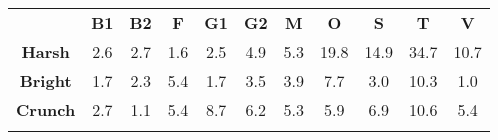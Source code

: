 \begin{tabular}{|c||c|c|c|c|c|c|c|c|c|c|}
	\cline{2-11}
	\multicolumn{1}{c|}{} & \bf{B1} & \bf{B2} & \bf{F} & \bf{G1} & \bf{G2} & \bf{M} & \bf{O} & \bf{S} & \bf{T} & \bf{V} \tabularnewline
	\hhline{-::=:=:=:=:=:=:=:=:=:=:}
	\bf{Harsh} &  2.6 &  2.7 &  1.6 &  2.5 &  4.9 &  5.3 & 19.8 & 14.9 & 34.7 & 10.7 \tabularnewline
	\hhline{-||-|-|-|-|-|-|-|-|-|-|}
	\bf{Bright} &  1.7 &  2.3 &  5.4 &  1.7 &  3.5 &  3.9 &  7.7 &  3.0 & 10.3 &  1.0 \tabularnewline
	\hhline{-||-|-|-|-|-|-|-|-|-|-|}
	\bf{Crunch} &  2.7 &  1.1 &  5.4 &  8.7 &  6.2 &  5.3 &  5.9 &  6.9 & 10.6 &  5.4 \tabularnewline
	\hhline{-||-|-|-|-|-|-|-|-|-|-|}
\end{tabular}

